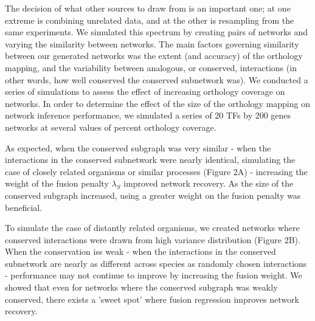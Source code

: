 \documentclass[11pt]{article}
\begin{document}
The decision of what other sources to draw from is an important one; at one extreme is combining unrelated data, and at the other is resampling from the same experiments. We simulated this spectrum by creating pairs of networks and varying the similarity between networks. The main factors governing similarity between our generated networks was the extent (and accuracy) of the orthology mapping, and the variability between analogous, or conserved, interactions (in other words, how well conserved the conserved subnetwork was). We conducted a series of simulations to assess the effect of increasing orthology coverage on networks. In order to determine the effect of the size of the orthology mapping on network inference performance, we simulated a series of 20 TFs by 200 genes networks at several values of percent orthology coverage. 

As expected, when the conserved subgraph was very similar - when the interactions in the conserved subnetwork were nearly identical, simulating the case of closely related organisms or similar processes (Figure 2A) - increasing the weight of the fusion penalty $\lambda_S$ improved network recovery. As the size of the conserved subgraph increased, using a greater weight on the fusion penalty was beneficial.

To simulate the case of distantly related organisms, we created networks where conserved interactions were drawn from high variance distribution (Figure 2B). When the conservation iss weak - when the interactions in the conserved subnetwork are nearly as different across species as randomly chosen interactions - performance may not continue to improve by increasing the fusion weight. We showed that even for networks where the conserved subgraph was weakly conserved, there exists a 'sweet spot' where fusion regression improves network recovery. 
\end{document}
